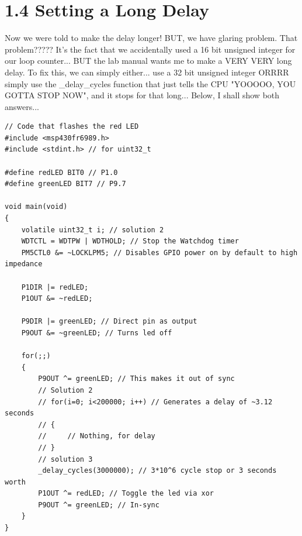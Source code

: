 \documentclass{article}
\begin{document}
\section{1.4 Setting a Long Delay}
Now we were told to make the delay longer! BUT, we have glaring problem. That problem????? It's the fact that we accidentally used a 16 bit unsigned integer for our loop counter... BUT the lab manual wants me to make a VERY VERY long delay. To fix this, we can simply either... use a 32 bit unsigned integer ORRRR simply use the \_delay\_cycles function that just tells the CPU "YOOOOO, YOU GOTTA STOP NOW", and it stops for that long... Below, I shall show both answers...
\newline
\begin{lstlisting}
// Code that flashes the red LED
#include <msp430fr6989.h>
#include <stdint.h> // for uint32_t

#define redLED BIT0 // P1.0
#define greenLED BIT7 // P9.7

void main(void)
{
    volatile uint32_t i; // solution 2
    WDTCTL = WDTPW | WDTHOLD; // Stop the Watchdog timer
    PM5CTL0 &= ~LOCKLPM5; // Disables GPIO power on by default to high impedance

    P1DIR |= redLED;
    P1OUT &= ~redLED;

    P9DIR |= greenLED; // Direct pin as output
    P9OUT &= ~greenLED; // Turns led off

    for(;;)
    {
        P9OUT ^= greenLED; // This makes it out of sync
        // Solution 2
        // for(i=0; i<200000; i++) // Generates a delay of ~3.12 seconds
        // {
        //     // Nothing, for delay
        // }
        // solution 3
        _delay_cycles(3000000); // 3*10^6 cycle stop or 3 seconds worth
        P1OUT ^= redLED; // Toggle the led via xor
        P9OUT ^= greenLED; // In-sync
    }
}
\end{lstlisting}
\end{document}

